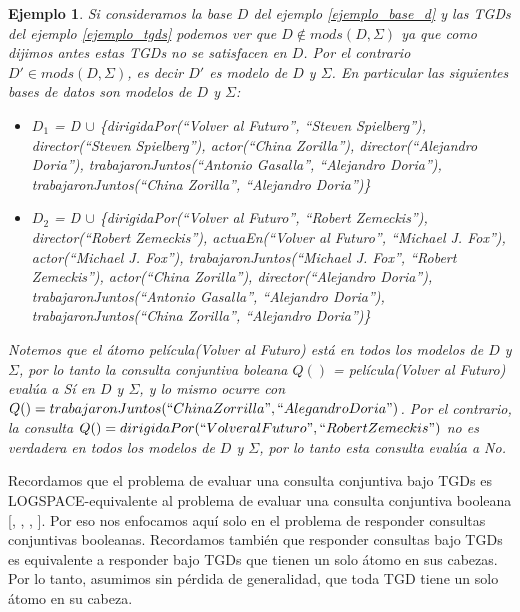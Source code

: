 \documentclass[11pt,a4paper,twoside]{tesis}
\newtheorem{exmp}{Ejemplo}
\begin{document}
\begin{exmp} \label{ejemplo_responder_consultas_bajo_tgds}
Si consideramos la base $D$ del ejemplo \ref{ejemplo_base_d} y las TGDs del ejemplo \ref{ejemplo_tgds} podemos ver que $D \notin mods(D, \Sigma)$ ya que como dijimos antes estas TGDs no se satisfacen en $D$. Por el contrario  $D\prime \in mods(D, \Sigma)$, es decir $D\prime$ es modelo de $D$ y $\Sigma$. En particular las siguientes bases de datos son modelos de  $D$ y $\Sigma$:   

\begin{itemize}
    \item 
      \(D_1\) = D \(\cup\) \{\textit{dirigidaPor(``Volver al Futuro'', ``Steven Spielberg''), director(``Steven Spielberg''),
    actor(``China Zorilla''), director(``Alejandro Doria''), trabajaronJuntos(``Antonio Gasalla'', ``Alejandro Doria''), trabajaronJuntos(``China Zorilla'', ``Alejandro Doria'')}\}
    \item  \(D_2\) = D \(\cup\)  \{\textit{dirigidaPor(``Volver al Futuro'', ``Robert Zemeckis''), director(``Robert Zemeckis''), actuaEn(``Volver al Futuro'', ``Michael J. Fox''), actor(``Michael J. Fox''), trabajaronJuntos(``Michael J. Fox'', ``Robert Zemeckis''),  actor(``China Zorilla''), director(``Alejandro Doria''), trabajaronJuntos(``Antonio Gasalla'', ``Alejandro Doria''), trabajaronJuntos(``China Zorilla'', ``Alejandro Doria'')}\}

\end{itemize} 

Notemos que el átomo \textit{película(Volver al Futuro)} está en todos los \textit{modelos} de $D$ y $\Sigma$, por lo tanto la consulta conjuntiva boleana $Q()$ = película(Volver al Futuro) evalúa a \textit{Sí} en $D$ y $\Sigma$, y lo mismo ocurre con $Q() = trabajaronJuntos(``China Zorrilla", ``Alegandro Doria")$. Por el contrario, la consulta $Q() = dirigidaPor(``Volver al Futuro", ``Robert Zemeckis")$ no es verdadera en todos los \textit{modelos} de $D$ y $\Sigma$, por lo tanto esta consulta evalúa a \textit{No}.
\end{exmp} 

Recordamos que el problema de evaluar una consulta conjuntiva bajo TGDs es LOGSPACE-equivalente al problema de evaluar una consulta conjuntiva booleana [\cite{Chandra}, \cite{Deutsch}, \cite{Fagin}, \cite{Johnson}]. Por eso nos enfocamos aquí solo en el problema de responder consultas conjuntivas booleanas. Recordamos también que responder consultas bajo TGDs es equivalente a responder bajo TGDs que tienen un solo átomo en sus cabezas. Por lo tanto, asumimos sin pérdida de generalidad, que toda TGD tiene un solo átomo en su cabeza.
\end{document}
